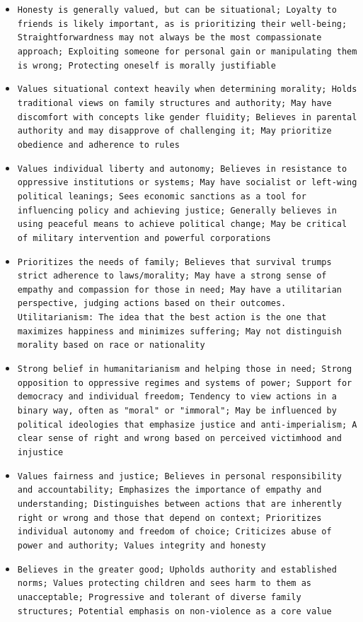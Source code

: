 \documentclass[11pt]{article}
\begin{document}
\begin{itemize}
\item \texttt{Honesty is generally valued, but can be situational; Loyalty to friends is likely important, as is prioritizing their well-being; Straightforwardness may not always be the most compassionate approach; Exploiting someone for personal gain or manipulating them is wrong; Protecting oneself is morally justifiable}
\item \texttt{Values situational context heavily when determining morality; Holds traditional views on family structures and authority; May have discomfort with concepts like gender fluidity; Believes in parental authority and may disapprove of challenging it; May prioritize obedience and adherence to rules}
\item \texttt{Values individual liberty and autonomy; Believes in resistance to oppressive institutions or systems; May have socialist or left-wing political leanings; Sees economic sanctions as a tool for influencing policy and achieving justice; Generally believes in using peaceful means to achieve political change; May be critical of military intervention and powerful corporations}
\item \texttt{Prioritizes the needs of family; Believes that survival trumps strict adherence to laws/morality; May have a strong sense of empathy and compassion for those in need; May have a utilitarian perspective, judging actions based on their outcomes. Utilitarianism: The idea that the best action is the one that maximizes happiness and minimizes suffering; May not distinguish morality based on race or nationality}
\item \texttt{Strong belief in humanitarianism and helping those in need; Strong opposition to oppressive regimes and systems of power; Support for democracy and individual freedom; Tendency to view actions in a binary way, often as "moral" or "immoral"; May be influenced by political ideologies that emphasize justice and anti-imperialism; A clear sense of right and wrong based on perceived victimhood and injustice}
\item \texttt{Values fairness and justice; Believes in personal responsibility and accountability; Emphasizes the importance of empathy and understanding; Distinguishes between actions that are inherently right or wrong and those that depend on context; Prioritizes individual autonomy and freedom of choice; Criticizes abuse of power and authority; Values integrity and honesty}
\item \texttt{Believes in the greater good; Upholds authority and established norms; Values protecting children and sees harm to them as unacceptable; Progressive and tolerant of diverse family structures; Potential emphasis on non-violence as a core value}

\end{itemize}
\end{document}
